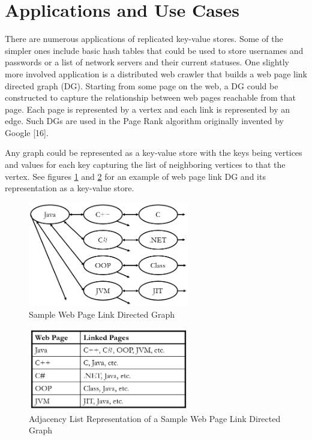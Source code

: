 \documentclass[sigconf,nonacm,10pt]{acmart}
\begin{document}
\section{Applications and Use Cases}
There are numerous applications of replicated key-value stores. Some of the simpler ones include basic hash tables that could be used to store usernames and passwords or a list of network servers and their current statuses. One slightly more involved application is a distributed web crawler that builds a web page link directed graph (DG). Starting from some page on the web, a DG could be constructed to capture the relationship between web pages reachable from that page. Each page is represented by a vertex and each link is represented by an edge. Such DGs are used in the Page Rank algorithm originally invented by Google [16].

Any graph could be represented as a key-value store with the keys being vertices and values for each key capturing the list of neighboring vertices to that the vertex. See figures \ref{fig:wiki1} and \ref{fig:wiki2} for an example of web page link DG and its representation as a key-value store.

\begin{figure}[h]
  \centering
  \includegraphics[width=7cm]{Fig11Wiki1}
  \caption{Sample Web Page Link Directed Graph}
  \label{fig:wiki1}
\end{figure}

\begin{figure}[h]
  \centering
  \includegraphics[width=7cm]{Fig12Wiki2}
  \caption{Adjacency List Representation of a Sample Web Page Link Directed Graph}
  \label{fig:wiki2}
\end{figure}
\end{document}
